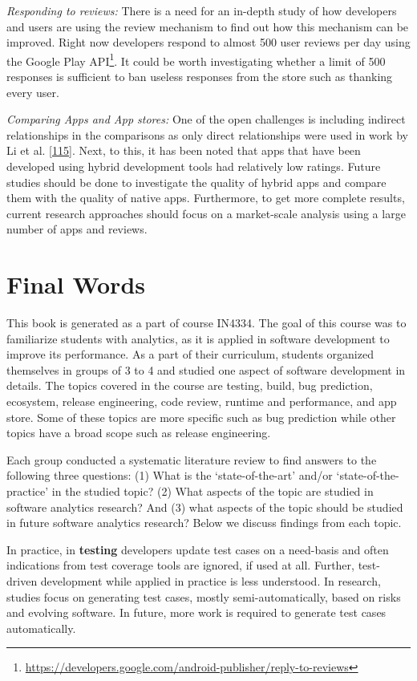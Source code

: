 \documentclass[]{book}
\let\rmarkdownfootnote\footnote%
\def\footnote{\protect\rmarkdownfootnote}
\begin{document}
\emph{Responding to reviews:} There is a need for an in-depth study of
how developers and users are using the review mechanism to find out how
this mechanism can be improved. Right now developers respond to almost
500 user reviews per day using the Google Play API\footnote{\url{https://developers.google.com/android-publisher/reply-to-reviews}}.
It could be worth investigating whether a limit of 500 responses is
sufficient to ban useless responses from the store such as thanking
every user.

\emph{Comparing Apps and App stores:} One of the open challenges is
including indirect relationships in the comparisons as only direct
relationships were used in work by Li et al.
{[}\protect\hyperlink{ref-li2017mining}{115}{]}. Next, to this, it has
been noted that apps that have been developed using hybrid development
tools had relatively low ratings. Future studies should be done to
investigate the quality of hybrid apps and compare them with the quality
of native apps. Furthermore, to get more complete results, current
research approaches should focus on a market-scale analysis using a
large number of apps and reviews.

\chapter{Final Words}\label{final-words}

This book is generated as a part of course IN4334. The goal of this
course was to familiarize students with analytics, as it is applied in
software development to improve its performance. As a part of their
curriculum, students organized themselves in groups of 3 to 4 and
studied one aspect of software development in details. The topics
covered in the course are testing, build, bug prediction, ecosystem,
release engineering, code review, runtime and performance, and app
store. Some of these topics are more specific such as bug prediction
while other topics have a broad scope such as release engineering.

Each group conducted a systematic literature review to find answers to
the following three questions: (1) What is the `state-of-the-art' and/or
`state-of-the-practice' in the studied topic? (2) What aspects of the
topic are studied in software analytics research? And (3) what aspects
of the topic should be studied in future software analytics research?
Below we discuss findings from each topic.

In practice, in \textbf{testing} developers update test cases on a
need-basis and often indications from test coverage tools are ignored,
if used at all. Further, test-driven development while applied in
practice is less understood. In research, studies focus on generating
test cases, mostly semi-automatically, based on risks and evolving
software. In future, more work is required to generate test cases
automatically.
\end{document}
